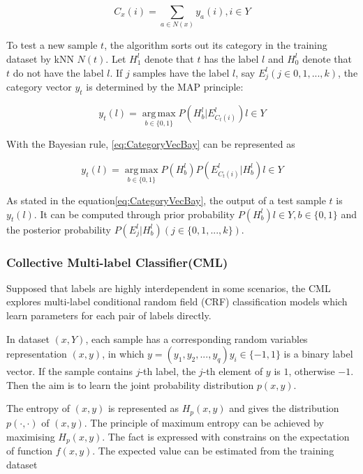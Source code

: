 \begin{equation}\label{eq:KNNCounting}
C_{x}(i) = \sum_{a \in N(x)} y_{a}(i), i \in Y
\end{equation}

To test a new sample $t$, the algorithm sorts out its category in the training dataset by kNN $N(t)$. Let $H_{1}^l$ denote that $t$ has the label $l$ and $H_{0}^l$ denote that $t$ do not have the label $l$. If $j$ samples have the label $l$, say $E_{j}^l (j \in {0,1,...,k})$, the category vector $y_{t}$ is determined by the MAP principle:

\begin{equation}\label{eq:CategoryVec}
y_{t}(l) = \operatorname*{arg\,max}_{b \in \{0,1\}} P(H_{b}^l|E_{C_{t}(i) }^l) l \in Y
\end{equation}

With the Bayesian rule, \ref{eq:CategoryVecBay} can be represented as

\begin{equation}\label{eq:CategoryVecBay}
y_{t}(l) = \operatorname*{arg\,max}_{b \in \{0,1\}} P(H_{b}^l)P(E_{C_{t}(i) }^l|H_{b}^l) l \in Y
\end{equation}

As stated in the equation\ref{eq:CategoryVecBay}, the output of a test sample $t$ is $y_{t}(l)$. It can be computed through prior probability $P(H_{b}^l) l \in Y, b \in \{0,1\}$ and the posterior probability $P(E_{j}^l|H_{b}^l) (j \in \{0,1,...,k\})$.

\subsubsection{Collective Multi-label Classifier(CML)}

Supposed that labels are highly interdependent in some scenarios, the CML explores multi-label conditional random field (CRF) classification models which learn  parameters for each pair of labels directly\citep{ghamrawi2005collective}.

In dataset $(x,Y)$, each sample has a corresponding random variables representation $(x,y)$, in which $y = (y_{1},y_{2},...,y_{q})  y_{i} \in \{-1,1\}$ is a binary label vector. If the sample contains $j$-th label, the $j$-th element of $y$ is $1$, otherwise $-1$. Then the aim is to learn the joint probability distribution $p(x,y)$.

The entropy of $(x,y)$ is represented as $H_{p}(x,y)$ and gives the distribution $p(\cdot,\cdot)$ of $(x,y)$. The principle of maximum entropy can be achieved by maximising $H_{p}(x,y)$. The fact is expressed with constrains on the expectation of function $f(x,y)$. The expected value can be estimated from the training dataset

